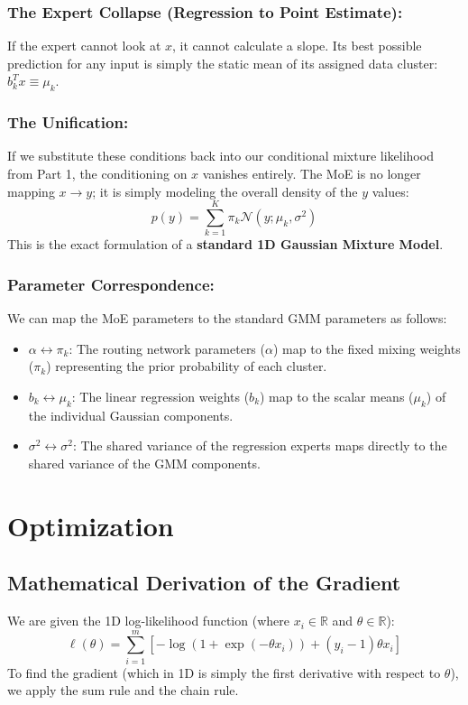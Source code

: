 \documentclass[twoside, 10pt]{article}
\begin{document}
\subsubsection{The Expert Collapse (Regression to Point Estimate):} 
If the expert cannot look at $x$, it cannot calculate a slope. Its best possible prediction for any input is simply the static mean of its assigned data cluster: $b_k^T x \equiv \mu_k$.
\subsubsection{The Unification:} 
If we substitute these conditions back into our conditional mixture likelihood from Part 1, the conditioning on $x$ vanishes entirely. The MoE is no longer mapping $x \rightarrow y$; it is simply modeling the overall density of the $y$ values:
\[
p(y) = \sum_{k=1}^K \pi_k \mathcal{N}(y; \mu_k, \sigma^2)
\]
This is the exact formulation of a \textbf{standard 1D Gaussian Mixture Model}.
\subsubsection{Parameter Correspondence:}
We can map the MoE parameters to the standard GMM parameters as follows:
\begin{itemize}
    \item $\alpha \longleftrightarrow \pi_k$: The routing network parameters ($\alpha$) map to the fixed mixing weights ($\pi_k$) representing the prior probability of each cluster.
    \item $b_k \longleftrightarrow \mu_k$: The linear regression weights ($b_k$) map to the scalar means ($\mu_k$) of the individual Gaussian components.
    \item $\sigma^2 \longleftrightarrow \sigma^2$: The shared variance of the regression experts maps directly to the shared variance of the GMM components.
\end{itemize}

\section{Optimization}
\subsection{Mathematical Derivation of the Gradient}
We are given the 1D log-likelihood function (where $x_i \in \mathbb{R}$ and $\theta \in \mathbb{R}$):
\[
\ell(\theta) = \sum_{i=1}^m \left[ -\log(1 + \exp(-\theta x_i)) + (y_i - 1)\theta x_i \right]
\]
To find the gradient (which in 1D is simply the first derivative with respect to $\theta$), we apply the sum rule and the chain rule.
\end{document}
